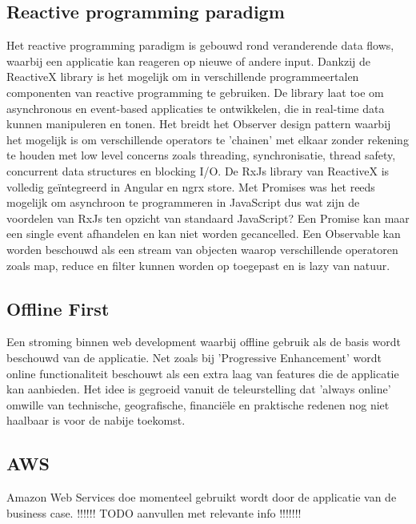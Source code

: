 \subsection{Reactive programming paradigm}
Het reactive programming paradigm is gebouwd rond veranderende data flows, waarbij een applicatie kan reageren op nieuwe of andere input. Dankzij de ReactiveX library is het mogelijk om in verschillende programmeertalen componenten van reactive programming te gebruiken. De library laat toe om asynchronous en event-based applicaties te ontwikkelen, die in real-time data kunnen manipuleren en tonen. Het breidt het Observer design pattern waarbij het mogelijk is om verschillende operators te 'chainen' met elkaar zonder rekening te houden met low level concerns zoals threading, synchronisatie, thread safety, concurrent data structures en blocking I/O. De RxJs library van ReactiveX is volledig ge\"integreerd in Angular en ngrx store. Met Promises was het reeds mogelijk om asynchroon te programmeren in JavaScript dus wat zijn de voordelen van RxJs ten opzicht van standaard JavaScript? Een Promise kan maar een single event afhandelen en kan niet worden gecancelled. Een Observable kan worden beschouwd als een stream van objecten waarop verschillende operatoren zoals map, reduce en filter kunnen worden op toegepast en is lazy van natuur.
\subsection{Offline First}
Een stroming binnen web development waarbij offline gebruik als de basis wordt beschouwd van de applicatie. Net zoals bij 'Progressive Enhancement' wordt online functionaliteit beschouwt als een extra laag van features die de applicatie kan aanbieden. Het idee is gegroeid vanuit de teleurstelling dat 'always online' omwille van technische, geografische, financi\"ele en praktische redenen nog niet haalbaar is voor de nabije toekomst.
\subsection{AWS}
Amazon Web Services doe momenteel gebruikt wordt door de applicatie van de business case. !!!!!! TODO aanvullen met relevante info !!!!!!!
